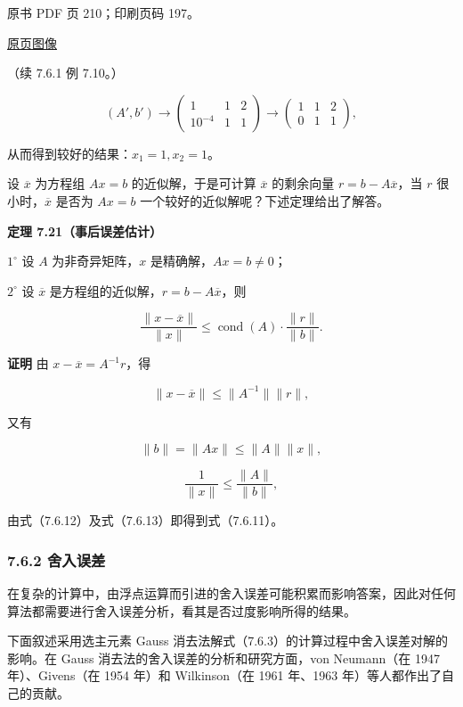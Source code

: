 \clearpage

原书 PDF 页 210；印刷页码 197。

\href{source-images/pdf-210.jpeg}{原页图像}

（续 7.6.1 例 7.10。）

\[
(A',b')\longrightarrow
\left(\begin{array}{cc|c}1&1&2\\10^{-4}&1&1\end{array}\right)
\longrightarrow
\left(\begin{array}{cc|c}1&1&2\\0&1&1\end{array}\right),
\]

从而得到较好的结果：\(x_1=1,x_2=1\)。

设 \(\overline x\) 为方程组 \(Ax=b\) 的近似解，于是可计算 \(\overline x\) 的剩余向量 \(r=b-A\overline x\)，当 \(r\) 很小时，\(\overline x\) 是否为 \(Ax=b\) 一个较好的近似解呢？下述定理给出了解答。

\textbf{定理 7.21（事后误差估计）}

\(1^\circ\) 设 \(A\) 为非奇异矩阵，\(x\) 是精确解，\(Ax=b\neq0\)；

\(2^\circ\) 设 \(\overline x\) 是方程组的近似解，\(r=b-A\overline x\)，则

\[
\frac{\|x-\overline x\|}{\|x\|}\leqslant\operatorname{cond}(A)\cdot\frac{\|r\|}{\|b\|}.
\tag{7.6.11}
\]

\textbf{证明} 由 \(x-\overline x=A^{-1}r\)，得

\[
\|x-\overline x\|\leqslant\|A^{-1}\|\|r\|,
\tag{7.6.12}
\]

又有

\[
\|b\|=\|Ax\|\leqslant\|A\|\|x\|,
\]

\[
\frac1{\|x\|}\leqslant\frac{\|A\|}{\|b\|},
\tag{7.6.13}
\]

由式（7.6.12）及式（7.6.13）即得到式（7.6.11）。

\subsubsection{7.6.2 舍入误差}\label{ch07b-ux820dux5165ux8befux5dee}

在复杂的计算中，由浮点运算而引进的舍入误差可能积累而影响答案，因此对任何算法都需要进行舍入误差分析，看其是否过度影响所得的结果。

下面叙述采用选主元素 Gauss 消去法解式（7.6.3）的计算过程中舍入误差对解的影响。在 Gauss 消去法的舍入误差的分析和研究方面，von Neumann（在 1947 年）、Givens（在 1954 年）和 Wilkinson（在 1961 年、1963 年）等人都作出了自己的贡献。

